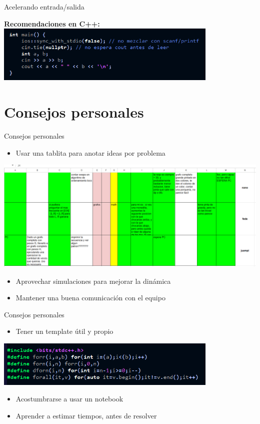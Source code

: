\documentclass{beamer}
\begin{document}
\begin{frame}[fragile]{Acelerando entrada/salida}

  \textbf{Recomendaciones en C++:}
  \includegraphics[width=0.8\textwidth,keepaspectratio]{fotos/fastcin.png}
\end{frame}

\section{Consejos personales}

\begin{frame}[fragile]{Consejos personales}
  \begin{itemize}
  \item  Usar una tablita para anotar ideas por problema
  \end{itemize}

  \includegraphics[width=1\textwidth,keepaspectratio]{fotos/tablita.png}

  \begin{itemize}
  \item Aprovechar simulaciones para mejorar la dinámica
  \item Mantener una buena comunicación con el equipo
  \end{itemize}

\end{frame}


\begin{frame}[fragile]{Consejos personales}
  \begin{itemize}
  \item Tener un template útil y propio
  \end{itemize}
  \includegraphics[width=0.8\textwidth,keepaspectratio]{fotos/template.png}

  \begin{itemize}
  \item Acostumbrarse a usar un notebook
  
  \item Aprender a estimar tiempos, antes de resolver
  \end{itemize}
\end{frame}
\end{document}
